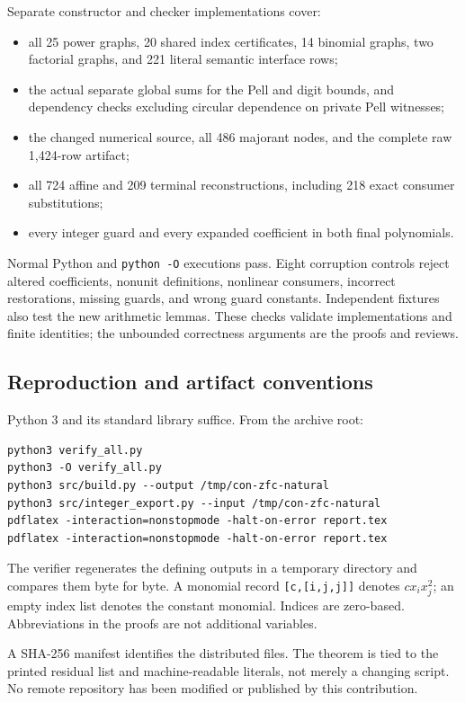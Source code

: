 \documentclass[11pt,letterpaper]{article}
\theoremstyle{definition}\newtheorem{definition}[theorem]{Definition}
\theoremstyle{remark}\newtheorem{remark}[theorem]{Remark}
\begin{document}
Separate constructor and checker implementations cover:
\begin{itemize}
\item all 25 power graphs, 20 shared index certificates,
      14 binomial graphs, two factorial graphs, and 221 literal
      semantic interface rows;
\item the actual separate global sums for the Pell and digit bounds,
      and dependency checks excluding circular dependence on private
      Pell witnesses;
\item the changed numerical source, all 486 majorant nodes, and the
      complete raw 1,424-row artifact;
\item all 724 affine and 209 terminal reconstructions, including
      218 exact consumer substitutions;
\item every integer guard and every expanded coefficient in both
      final polynomials.
\end{itemize}
Normal Python and \texttt{python -O} executions pass. Eight corruption
controls reject altered coefficients, nonunit definitions, nonlinear
consumers, incorrect restorations, missing guards, and wrong guard
constants. Independent fixtures also test the new arithmetic lemmas.
These checks validate implementations and finite identities; the
unbounded correctness arguments are the proofs and reviews.

\subsection{Reproduction and artifact conventions}

Python 3 and its standard library suffice. From the archive root:
\begin{lstlisting}
python3 verify_all.py
python3 -O verify_all.py
python3 src/build.py --output /tmp/con-zfc-natural
python3 src/integer_export.py --input /tmp/con-zfc-natural
pdflatex -interaction=nonstopmode -halt-on-error report.tex
pdflatex -interaction=nonstopmode -halt-on-error report.tex
\end{lstlisting}
The verifier regenerates the defining outputs in a temporary directory
and compares them byte for byte. A monomial record
\texttt{[c,[i,j,j]]} denotes $c x_i x_j^2$; an empty index list denotes
the constant monomial. Indices are zero-based.
Abbreviations in the proofs are not additional variables.

A SHA-256 manifest identifies the distributed files. The theorem is
tied to the printed residual list and machine-readable literals,
not merely a changing script. No remote repository has been modified
or published by this contribution.
\end{document}

